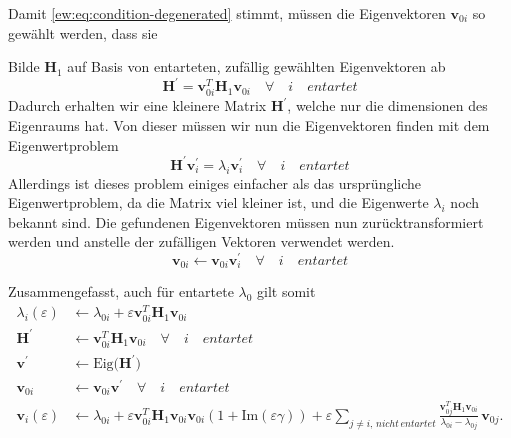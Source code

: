 Damit \ref{ew:eq:condition-degenerated} stimmt, müssen die Eigenvektoren $\bm v_{0i}$ so gewählt werden, dass sie %

Bilde $\bm H_1$ auf Basis von entarteten, zufällig gewählten Eigenvektoren ab
\begin{equation*}
    \bm H^\prime = \bm v_{0i}^T \bm H_1 \bm v_{0i} \quad \forall \quad i \quad entartet
\end{equation*}
Dadurch erhalten wir eine kleinere Matrix $\bm H^\prime$, welche nur die dimensionen des Eigenraums hat.
Von dieser müssen wir nun die Eigenvektoren finden mit dem Eigenwertproblem
\begin{equation*}
    \bm H^\prime \bm v_{i}^\prime = \lambda_{i} \bm v_i^\prime \quad \forall \quad i \quad entartet
\end{equation*}
Allerdings ist dieses problem einiges einfacher als das ursprüngliche Eigenwertproblem, da die Matrix viel kleiner ist, und die Eigenwerte $\lambda_i$ noch bekannt sind.
Die gefundenen Eigenvektoren müssen nun zurücktransformiert werden und anstelle der zufälligen Vektoren verwendet werden.
\begin{equation*}
    \bm v_{0i} \gets \bm v_{0i} \bm v_{i}^\prime \quad \forall \quad i \quad entartet
\end{equation*}


Zusammengefasst, auch für entartete $\lambda_0$ gilt somit
\begin{align*}
    \lambda_i(\varepsilon)
    & \gets
    \lambda_{0i} + \varepsilon \bm v_{0i}^T \bm H_1 \bm v_{0i}\\
    \bm H^\prime & \gets \bm v_{0i}^T \bm H_1 \bm v_{0i} \quad \forall \quad i \quad entartet \\
    \bm v^\prime & \gets \mathrm{Eig} \Big( \bm H^\prime \Big) \\
    \bm v_{0i} & \gets \bm v_{0i} \bm v^\prime  \quad \forall \quad i \quad entartet \\
    \bm v_i(\varepsilon)
    & \gets
    \lambda_{0i} + \varepsilon \bm v_{0i}^T \bm H_1 \bm v_{0i}
        \bm v_{0i} ( 1 + \mathrm{Im}(\varepsilon \gamma) ) + \varepsilon \sum_{j \neq i, \,nicht\,entartet}
        \frac{\bm v_{0j}^T \bm H_1 \bm v_{0i}}{\lambda_{0i} - \lambda_{0j}}
        \, \bm v_{0j}.
\end{align*}
